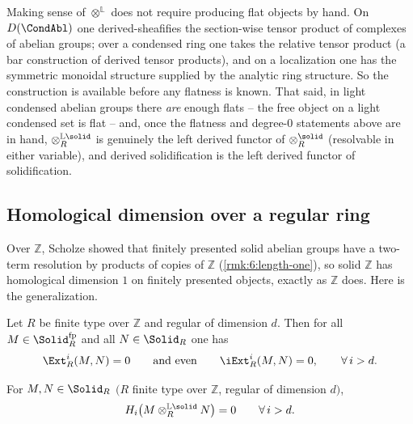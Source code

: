 \begin{remark}
\label{rmk:11:derived-tensor-def}
Making sense of $\otimes^{\mathbb{L}}$ does not require producing flat objects
by hand. On $D(\CondAbl)$ one derived-sheafifies the section-wise tensor
product of complexes of abelian groups; over a condensed ring one takes the
relative tensor product (a bar construction of derived tensor products), and on
a localization one has the symmetric monoidal structure supplied by the
analytic ring structure. So the construction is available before any flatness
is known. That said, in light condensed abelian groups there \emph{are} enough
flats -- the free object on a light condensed set is flat -- and, once the
flatness and degree-$0$ statements above are in hand, $\otimes^{\mathbb{L}
\solid}_{R}$ is genuinely the left derived functor of $\otimes^{\solid}_{R}$
(resolvable in either variable), and derived solidification is the left derived
functor of solidification.
\end{remark}

\subsection{Homological dimension over a regular ring}

Over $\mathbb{Z}$, Scholze showed that finitely presented solid abelian groups
have a two-term resolution by products of copies of $\mathbb{Z}$
(\cref{rmk:6:length-one}), so solid $\mathbb{Z}$ has homological dimension $1$
on finitely presented objects, exactly as $\mathbb{Z}$ does. Here is the
generalization.

\begin{theorem}
\label{thm:11:regular-ext}
Let $R$ be finite type over $\mathbb{Z}$ and regular of dimension $d$. Then for
all $M\in\Solid_{R}^{\mathrm{fp}}$ and all $N\in\Solid_{R}$ one has
\begin{equation*}
\Ext^{i}_{R}(M,N)=0\qquad\text{and even}\qquad \iExt^{i}_{R}(M,N)=0,\qquad
\forall\,i>d.
\end{equation*}
\end{theorem}

\begin{corollary}
\label{cor:11:tor-bound}
For $M,N\in\Solid_{R}$ $(R$ finite type over $\mathbb{Z}$, regular of dimension
$d)$,
\begin{equation*}
H_{i}\bigl(M\otimes^{\mathbb{L}\solid}_{R}N\bigr)=0\qquad\forall\,i>d.
\end{equation*}
\end{corollary}

